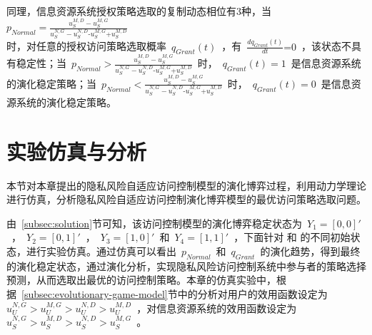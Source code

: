  同理，信息资源系统授权策略选取的复制动态相位有3种，当~${{p}_{Normal}}=\frac{u_{S}^{M,D}-u_{S}^{M,G}}{u_{S}^{N,G}-u_{S}^{N,D}\text{-}u_{S}^{M,G}\text{+}u_{S}^{M,D}}$\\时，对任意的授权访问策略选取概率~$q_{Grant}(t)$~，有~$\frac{d{{q}_{Grant}}(t)}{dt}\text{=0}$~，该状态不具有稳定性；当~${{p}_{Normal}}>\frac{u_{S}^{M,D}-u_{S}^{M,G}}{u_{S}^{N,G}-u_{S}^{N,D}\text{-}u_{S}^{M,G}\text{+}u_{S}^{M,D}}$~时，~$q_{Grant}(t)=1$~是信息资源系统的演化稳定策略；当~${{p}_{Normal}}<\frac{u_{S}^{M,D}-u_{S}^{M,G}}{u_{S}^{N,G}-u_{S}^{N,D}\text{-}u_{S}^{M,G}\text{+}u_{S}^{M,D}}$~时，~$q_{Grant}(t)=0$~是信息资源系统的演化稳定策略。
 
 
 \section{实验仿真与分析}
本节对本章提出的隐私风险自适应访问控制模型的演化博弈过程，利用动力学理论进行仿真，分析隐私风险自适应访问控制演化博弈模型的最优访问策略选取问题。

 由~\ref{subsec:solution}节可知，该访问控制模型的演化博弈稳定状态为~${{Y}_{1}}=[0,0]'$~，~${{Y}_{2}}=[0,1]'$~，~${{Y}_{3}}=[1,0]'$~和~${{Y}_{4}}=[1,1]'$~，下面针对 和 的不同初始状态，进行实验仿真。通过仿真可以看出~$p_{Normal}$~和~$q_{Grant}$~的演化趋势，得到最终的演化稳定状态，通过演化分析，实现隐私风险访问控制系统中参与者的策略选择预测，从而选取出最优的访问控制策略。本章的仿真实验中，根据~\ref{subsec:evolutionary-game-model}节中的分析对用户的效用函数设定为~$u_{U}^{N,G}>u_{U}^{M,G}>u_{U}^{N,D}>u_{U}^{M,D}$~，对信息资源系统的效用函数设定为~$u_{S}^{N,G}>u_{S}^{M,D}>u_{S}^{N,D}>u_{S}^{M,G}$~。

